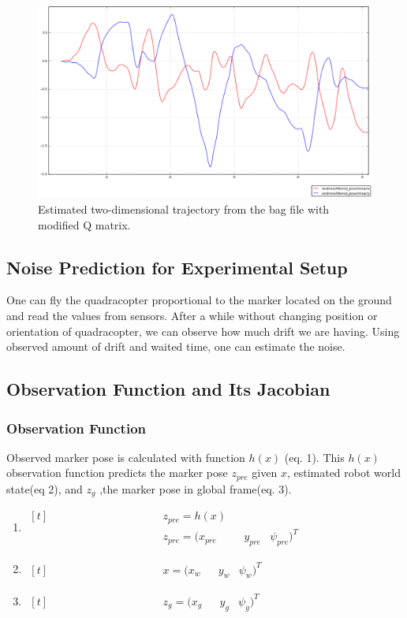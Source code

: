 \documentclass[14pt,a4paper]{article}
\begin{document}
	\begin{figure}[htbp]
	\centering
	\includegraphics[scale=0.4]{filtered_pose_modifiedQ.png}
  	\caption{Estimated two-dimensional trajectory from the bag file with modified Q matrix.}
    \label{graph:filtered_pose_modifiedQ}
	\end{figure}
	
	\subsection{Noise Prediction for Experimental Setup}	
	
	One can fly the quadracopter proportional to the marker located on the ground and read the values from sensors. After a while without changing position or orientation of quadracopter, we can observe how much drift we are having. Using observed amount of drift and waited time, one can estimate the noise.
	
	\subsection{Observation Function and Its Jacobian}
	
		\subsubsection{Observation Function}
		
	 	Observed marker pose is calculated with function $h(x)$ (eq. 1). This $h(x)$ observation function predicts the marker pose $z_{pre}$ given $x$, estimated robot world state(eq 2), and $z_{g}$ ,the marker pose in global frame(eq. 3).
		 
		\begin{enumerate}
		\item $\begin{aligned}[t]
		    &&&&&&&&&&&&& z_{pre}=h(x) \\
		    &&&&&&&&&&&&& z_{pre} = (x_{pre}&&y_{pre}&\psi_{pre})^T
		\end{aligned}$
		\item $\begin{aligned}[t]
		    &&&&&&&&&&&&& x = (x_{w}&&y_{w}&\psi_{w})^T
		\end{aligned}$
		\item $\begin{aligned}[t]
		    &&&&&&&&&&&&& z_{g} = (x_{g}&&y_{g}&\psi_{g})^T
		\end{aligned}$
		\end{enumerate}
	
\end{document}
